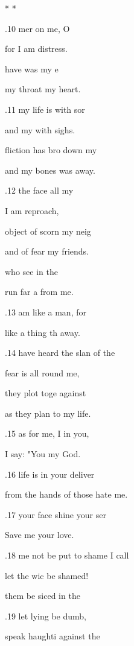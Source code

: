 \pl{*} * * 

.10  mer on me, O  

for I am  distress. 

 have was my e 

my throat  my heart. 

.11  my life is  with sor 

and my  with sighs. 

fliction has bro down my  

and my bones was away. 

.12  the face  all my  

I am  reproach, 

 object of scorn  my neig 

and of fear  my friends. 

 who see  in the  

run far a from me. 

.13  am like a  man, for 

like a thing th away. 

.14  have heard the slan of the  

fear is all round me, 

 they plot toge against  

as they plan to  my life. 

.15  as for me, I  in you,  

I say: "You  my God. 

.16  life is in your  deliver  

from the hands of those  hate me. 

.17  your face shine  your ser 

Save me  your love. 

.18  me not be put to shame  I call  

let the wic be shamed! 

 them be siced in the  

.19 let lying  be dumb, 

 speak haughti against the  

